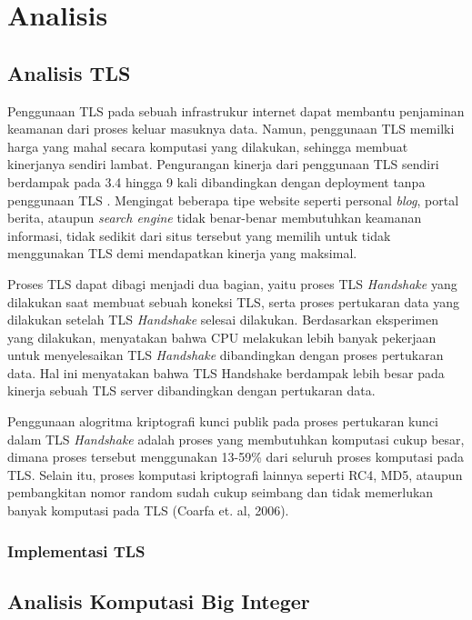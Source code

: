 \chapter{Analisis}

\section{Analisis TLS}
Penggunaan TLS pada sebuah infrastrukur internet dapat membantu penjaminan keamanan dari proses keluar masuknya data. Namun, penggunaan TLS memilki harga yang mahal secara komputasi yang dilakukan, sehingga membuat kinerjanya sendiri lambat. Pengurangan kinerja dari penggunaan TLS sendiri berdampak pada 3.4 hingga 9 kali dibandingkan dengan deployment tanpa penggunaan TLS \citep{perf_tls}. Mengingat beberapa tipe website seperti personal \textit{blog}, portal berita, ataupun \textit{search engine }tidak benar-benar membutuhkan keamanan informasi, tidak sedikit dari situs tersebut yang memilih untuk tidak menggunakan TLS demi mendapatkan kinerja yang maksimal.

Proses TLS dapat dibagi menjadi dua bagian, yaitu proses TLS \textit{Handshake} yang dilakukan saat membuat sebuah koneksi TLS, serta proses pertukaran data yang dilakukan setelah TLS \textit{Handshake} selesai dilakukan. Berdasarkan eksperimen yang dilakukan, \cite{perf_tls} menyatakan bahwa CPU melakukan lebih banyak pekerjaan untuk menyelesaikan TLS \textit{Handshake} dibandingkan dengan proses pertukaran data. Hal ini menyatakan bahwa TLS Handshake berdampak lebih besar pada kinerja sebuah TLS server dibandingkan dengan pertukaran data.

Penggunaan alogritma kriptografi kunci publik pada proses pertukaran kunci  dalam TLS \textit{Handshake} adalah proses yang membutuhkan komputasi cukup besar, dimana proses tersebut menggunakan 13-59\% dari seluruh proses komputasi pada TLS. Selain itu, proses komputasi kriptografi lainnya seperti RC4, MD5, ataupun pembangkitan nomor random sudah cukup seimbang dan tidak memerlukan banyak komputasi pada TLS (Coarfa et. al, 2006).

\subsection{Implementasi TLS}
%


\section{Analisis Komputasi Big Integer}

